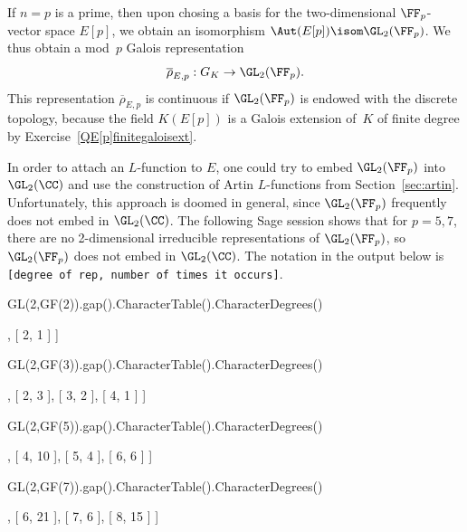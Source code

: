 If $n=p$ is a prime, then upon chosing a basis for the two-dimensional
$\FF_p$-vector space $E[p]$, we obtain an isomorphism $\Aut(E[p]) \isom
\GL_2(\FF_p)$.  We thus obtain a mod~$p$ Galois representation
\[
\overline{\rho}_{E,p} : G_K \to \GL_2(\FF_p).
\]
This representation $\overline{\rho}_{E,p}$ is continuous if $\GL_2(\FF_p)$ is endowed with the
discrete topology, because the field $K(E[p])$
is a Galois extension of~$K$ of finite degree
by Exercise~\ref{QE[p]finitegaloisext}.

In order to attach an $L$-function to $E$, one could try to embed
$\GL_2(\FF_p)$ into $\GL_2(\CC)$ and use the construction of Artin
$L$-functions from Section~\ref{sec:artin}.
Unfortunately, this approach is doomed in general, since
$\GL_2(\FF_p)$ frequently does not embed in $\GL_2(\CC)$.
The following Sage session shows that for $p=5,7$, there are
no 2-dimensional irreducible representations of $\GL_2(\FF_p)$,
so $\GL_2(\FF_p)$ does not embed in $\GL_2(\CC)$.
The notation in the output below is
{\tt [degree of rep, number of times it occurs]}.
\begin{sagecode}
\begin{sagecell}
GL(2,GF(2)).gap().CharacterTable().CharacterDegrees()
\end{sagecell}
\begin{sageout}
[ [ 1, 2 ], [ 2, 1 ] ]
\end{sageout}
\begin{sagecell}
GL(2,GF(3)).gap().CharacterTable().CharacterDegrees()
\end{sagecell}
\begin{sageout}
[ [ 1, 2 ], [ 2, 3 ], [ 3, 2 ], [ 4, 1 ] ]
\end{sageout}
\begin{sagecell}
GL(2,GF(5)).gap().CharacterTable().CharacterDegrees()
\end{sagecell}
\begin{sageout}
[ [ 1, 4 ], [ 4, 10 ], [ 5, 4 ], [ 6, 6 ] ]
\end{sageout}
\begin{sagecell}
GL(2,GF(7)).gap().CharacterTable().CharacterDegrees()
\end{sagecell}
\begin{sageout}
[ [ 1, 6 ], [ 6, 21 ], [ 7, 6 ], [ 8, 15 ] ]
\end{sageout}
\end{sagecode}

